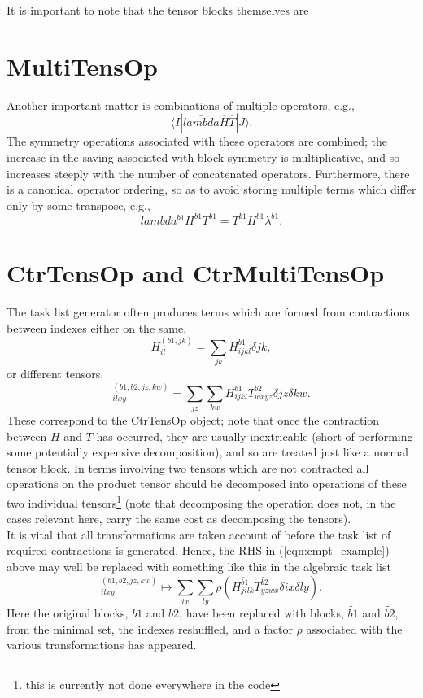 \noindent It is important to note that the tensor blocks themselves are 

\section{ MultiTensOp } 
\noindent Another important matter is combinations of multiple operators, e.g.,
\begin{equation}
\langle I | \hat{lambda}\hat{H}\hat{T} | J \rangle .
\end{equation}
The symmetry operations associated with these operators are combined; the increase in the saving
associated with block symmetry is multiplicative, and so increases steeply with
the number of concatenated operators. Furthermore, there is a canonical
operator ordering, so as to avoid storing multiple terms which differ only by some transpose, 
e.g., 
\begin{equation}
lambda^{b1}H^{b1}T^{b1} = T^{b1}H^{b1}\lambda^{b1}. 
\label{eqn:tens_block_combined}
\end{equation}
\section{CtrTensOp and CtrMultiTensOp}
The task list generator often produces terms which are formed from contractions between indexes either
on the same,
\begin{equation*}
H^{(b1,jk)}_{il} = \sum_{jk} H^{b1}_{ijkl}\delta{jk},
\end{equation*}
or different tensors, 
\begin{equation}
[HT]^{(b1,b2,jz,kw)}_{ilxy} = \sum_{jz} \sum_{kw} H^{b1}_{ijkl}T^{b2}_{wxyz}\delta{jz}\delta{kw}.
\label{eqn:cmtp_example}
\end{equation}
These correspond to the CtrTensOp object; note that once the contraction between $H$ and $T$ has occurred, they
are usually inextricable (short of performing some potentially expensive decomposition), and so 
are treated just like a normal tensor block. In terms involving two
tensors which are not contracted all operations on the product tensor should be decomposed into operations of these 
two individual tensors\footnote{this is currently not done everywhere in the code} (note that decomposing the
operation does not, in the cases relevant here, carry the same cost as decomposing the tensors).\\

\noindent It is vital that all transformations are taken account of before the task list of required contractions
is generated. Hence, the RHS in (\ref{eqn:cmpt_example}) above may well be replaced with something like this in
the algebraic task list
\begin{equation}
[HT]^{(b1,b2,jz,kw)}_{ilxy} \mapsto \sum_{ix} \sum_{ly} \rho(H^{\tilde{b1}}_{jilk}T^{\tilde{b2}}_{yzwx}\delta{ix}\delta{ly}).
\label{eqn:cmtp_example_symm}
\end{equation}
\noindent Here the original blocks,  $b1$ and $b2$, have been replaced with blocks, $\tilde{b1}$ and $\tilde{b2}$,
from the minimal set, the indexes reshuffled, and a factor $\rho$ associated with the various transformations has appeared. 

